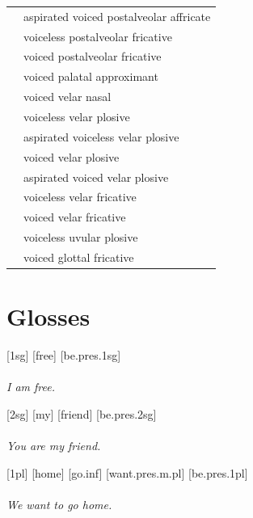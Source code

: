 \documentclass[12pt]{article}
\begin{document}
\begin{xltabular}{\textwidth}{lL}
   & aspirated voiced postalveolar affricate \\
   & voiceless postalveolar fricative \\
   & voiced postalveolar fricative \\
   & voiced palatal approximant \\
   & voiced velar nasal \\
   & voiceless velar plosive \\
   & aspirated voiceless velar plosive \\
   & voiced velar plosive \\
   & aspirated voiced velar plosive \\
   & voiceless velar fricative \\
   & voiced velar fricative \\
   & voiceless uvular plosive \\
  \ipa{\texthth} & voiced glottal fricative \\
\end{xltabular}

\newpage\section{Glosses}

\ex[lingstyle=custom_nlevel]
\begingl
{}[{\sc 1sg}]
[free]
[be.{\sc pres.1sg}]
\\{\normalfont{}}\\\textit{I am free.}
\endgl
\xe

\ex[lingstyle=custom_nlevel]
\begingl
{}[{\sc 2sg}]
[my]
[friend]
[be.{\sc pres.2sg}]
\\{\normalfont{}}\\\textit{You are my friend.}
\endgl
\xe

\ex[lingstyle=custom_nlevel]
\begingl
{}[{\sc 1pl}]
[home]
[go.{\sc inf}]
[want.{\sc pres.m.pl}]
[be.{\sc pres.1pl}]
\\{\normalfont{}}\\\textit{We want to go home.}
\endgl
\xe
\end{document}
